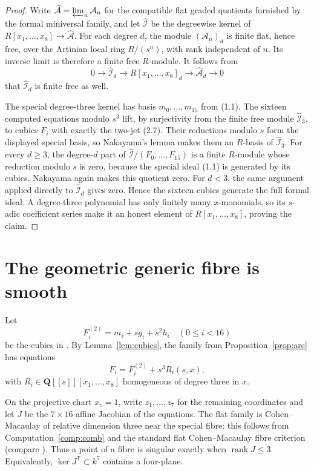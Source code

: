 \documentclass[11pt]{article}
\theoremstyle{definition}
\theoremstyle{remark}
\newcommand{\QQ}{\mathbf Q}
\newcommand{\rank}{\operatorname{rank}}
\begin{document}
\begin{proof}
Write $\widehat{\mathcal A}=\varprojlim_n\mathcal A_n$ for the compatible
flat graded quotients furnished by the formal miniversal family, and let
$\widehat{\mathcal I}$ be the degreewise kernel of
$R[x_1,\ldots,x_8]\to\widehat{\mathcal A}$.  For each degree $d$, the
module $(\mathcal A_n)_d$ is finite flat, hence free, over the Artinian local
ring $R/(s^n)$, with rank independent of $n$.  Its inverse limit is therefore
a finite free $R$-module.  It follows from
\[
 0\longrightarrow\widehat{\mathcal I}_d
 \longrightarrow R[x_1,\ldots,x_8]_d
 \longrightarrow\widehat{\mathcal A}_d\longrightarrow0
\]
that $\widehat{\mathcal I}_d$ is finite free as well.

The special degree-three kernel has basis $m_0,\ldots,m_{15}$ from (1.1).
The sixteen computed equations modulo $s^3$ lift, by surjectivity from the
finite free module $\widehat{\mathcal I}_3$, to cubics $F_i$ with exactly the
two-jet (2.7).  Their reductions modulo $s$ form the displayed special basis,
so Nakayama's lemma makes them an $R$-basis of
$\widehat{\mathcal I}_3$.  For every
$d\ge3$, the degree-$d$ part of
$\widehat{\mathcal I}/(F_0,\ldots,F_{15})$ is a finite $R$-module whose
reduction modulo $s$ is zero, because the special ideal (1.1) is generated
by its cubics.  Nakayama again makes this quotient zero.  For $d<3$, the same
argument applied directly to $\widehat{\mathcal I}_d$ gives zero.  Hence the sixteen
cubics generate the full formal ideal.  A degree-three polynomial has only
finitely many $x$-monomials, so its $s$-adic coefficient series make it an
honest element of $R[x_1,\ldots,x_8]$, proving the claim.
\end{proof}

\section{The geometric generic fibre is smooth}

Let
\[
 F_i^{(2)}=m_i+sg_i+s^2h_i\quad(0\le i<16)                    \tag{3.1}
\]
be the cubics in .  By
Lemma~\ref{lem:cubics}, the family from Proposition~\ref{prop:arc} has equations
\[
 F_i=F_i^{(2)}+s^3R_i(s,x),                                   \tag{3.2}
\]
with $R_i\in\QQ[[s]][x_1,\ldots,x_8]$ homogeneous of degree three in $x$.

On the projective chart $x_v=1$, write $z_1,\ldots,z_7$ for the remaining
coordinates and let $J$ be the $7\times16$ affine Jacobian of the equations.
The flat family is Cohen--Macaulay of relative dimension three near the
special fibre: this follows from Computation~\ref{comp:comb} and the standard
flat Cohen--Macaulay fibre criterion (compare \cite[Tag 0E7T]{Stacks}).
Thus a point of a fibre is singular exactly when $\rank J\le3$.  Equivalently,
$\ker J^{\mathsf T}\subset k^7$ contains a four-plane.
\end{document}

